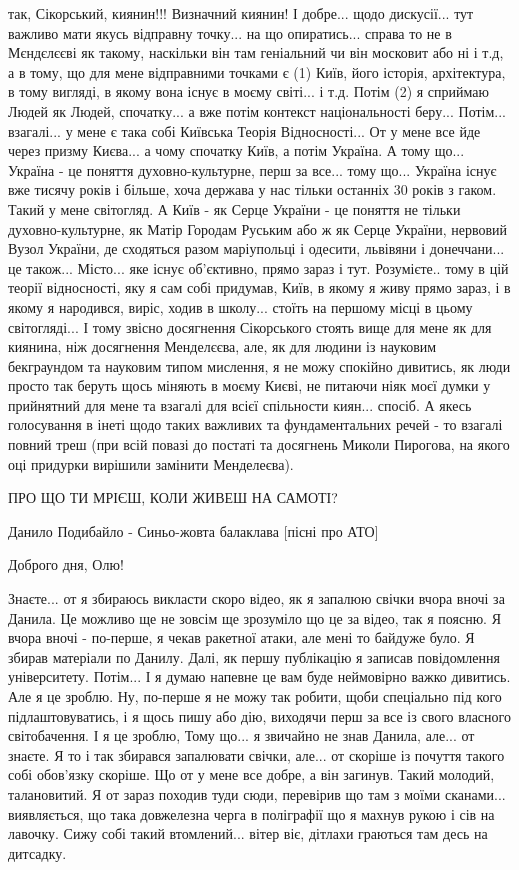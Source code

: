  так, Сікорський, киянин!!! Визначний киянин! І добре... щодо дискусії... тут
важливо мати якусь відправну точку... на що опиратись... справа то не в
Мєндєлєєві як такому, наскільки він там геніальний чи він московит або ні і
т.д, а в тому, що для мене відправними точками є (1) Київ, його історія,
архітектура, в тому вигляді, в якому вона існує в моєму світі... і т.д. Потім
(2) я сприймаю Людей як Людей, спочатку... а вже потім контекст національності
беру... Потім... взагалі... у мене є така собі Київська Теорія Відносності...
От у мене все йде через призму Києва... а чому спочатку Київ, а потім Україна.
А тому що... Україна - це поняття духовно-культурне, перш за все... тому що...
Україна існує вже тисячу років і більше, хоча держава у нас тільки останніх 30
років з гаком. Такий у мене світогляд. А Київ - як Серце України - це поняття
не тільки духовно-культурне, як Матір Городам Руським або ж як Серце України,
нервовий Вузол України, де сходяться разом маріупольці і одесити, львівяни і
донеччани... це також... Місто... яке існує об'єктивно, прямо зараз і тут.
Розумієте.. тому в цій теорії відносності, яку я сам собі придумав, Київ, в
якому я живу прямо зараз, і в якому я народився, виріс, ходив в школу... стоїть
на першому місці в цьому світогляді... І тому звісно досягнення Сікорського
стоять вище для мене як для киянина, ніж досягнення Менделєєва, але, як для
людини із науковим бекграундом та науковим типом мислення, я не можу спокійно
дивитись, як люди просто так беруть щось міняють в моєму Києві, не питаючи ніяк
моєї думки у прийнятний для мене та взагалі для всієї спільности киян...
спосіб. А якесь голосування в інеті щодо таких важливих та фундаментальних
речей - то взагалі повний треш (при всій повазі до постаті та досягнень Миколи
Пирогова, на якого оці придурки вирішили замінити Менделеєва).

ПРО ЩО ТИ МРІЄШ, КОЛИ ЖИВЕШ НА САМОТІ?

Данило Подибайло - Синьо-жовта балаклава [пісні про АТО]

Доброго дня, Олю! 

Знаєте... от я збираюсь викласти скоро відео, як я запалюю свічки вчора вночі
за Данила. Це можливо ще не зовсім ще зрозуміло що це за відео, так я поясню. Я
вчора вночі - по-перше, я чекав ракетної атаки, але мені то байдуже було. Я
збирав матеріали по Данилу. Далі, як першу публікацію я записав повідомлення
університету. Потім... І я думаю напевне це вам буде неймовірно важко дивитись.
Але я це зроблю. Ну, по-перше я не можу так робити, щоби спеціально під кого
підлаштовуватись, і я щось пишу або дію, виходячи перш за все із свого власного
світобачення. І я це зроблю, Тому що... я звичайно не знав Данила, але... от
знаєте. Я то і так збирався запалювати свічки, але...  от скоріше із почуття
такого собі обов'язку скоріше. Що от у мене все добре, а він загинув. Такий
молодий, талановитий. Я от зараз походив туди сюди, перевірив що там з моїми
сканами... виявляється, що така довжелезна черга в поліграфії що я махнув рукою
і сів на лавочку. Сижу собі такий втомлений... вітер віє, дітлахи граються там
десь на дитсадку. 

